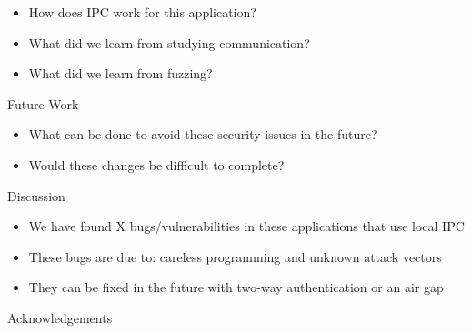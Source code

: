 \documentclass{article}
\begin{document}
\begin{outline}
\begin{outline}
        \begin{itemize}
            \item How does IPC work for this application?
            \item What did we learn from studying communication?
            \item What did we learn from fuzzing?
        \end{itemize}
    \end{outline}
    \item Future Work
    \begin{itemize}
        \item What can be done to avoid these security issues in the future?
        \item Would these changes be difficult to complete?
    \end{itemize}
    \item Discussion
    \begin{itemize}
        \item We have found X bugs/vulnerabilities in these applications that use local IPC
        \item These bugs are due to: careless programming and unknown attack vectors
        \item They can be fixed in the future with two-way authentication or an air gap
    \end{itemize}
    \item Acknowledgements
\end{outline}

\nocite{*}


\end{document}
